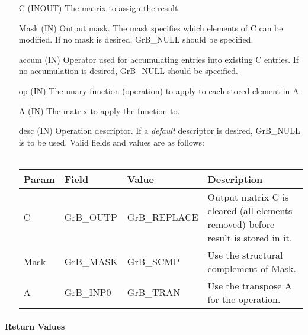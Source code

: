 \begin{itemize}[leftmargin=1.1in]
    \item[{\sf C}]     ({\sf INOUT}) The matrix to assign the result.

    \item[{\sf Mask}]  ({\sf IN}) Output mask. The mask
    specifies which elements of {\sf C} can be modified.
    If no mask is desired, {\sf GrB\_NULL} should be specified.

    \item[{\sf accum}] ({\sf IN}) Operator used for accumulating entries into existing {\sf C} entries. 
			If no accumulation is desired, {\sf GrB\_NULL} should be specified.

    \item[{\sf op}]    ({\sf IN}) The unary function (operation) to apply to each stored element in {\sf A}.
    \item[{\sf A}]     ({\sf IN}) The matrix to apply the function to.
    \item[{\sf desc}]  ({\sf IN}) Operation descriptor. If a
    \emph{default} descriptor is desired, {\sf GrB\_NULL} is to be
    used.  Valid fields and values are as follows: \\ ~\\
    \begin{tabular}{lllp{2.5in}}
    Param & Field  & Value & Description \\
    \hline
    {\sf C}    & {\sf GrB\_OUTP} & {\sf GrB\_REPLACE} & Output matrix {\sf C} is cleared (all elements removed) before result is stored in it. \\
    {\sf Mask} & {\sf GrB\_MASK} & {\sf GrB\_SCMP}    & Use the structural complement of {\sf Mask}. \\
    {\sf A}    & {\sf GrB\_INP0} & {\sf GrB\_TRAN}    & Use the transpose {\sf A} for the operation.\\
    \end{tabular}
\end{itemize}

\paragraph{Return Values}

